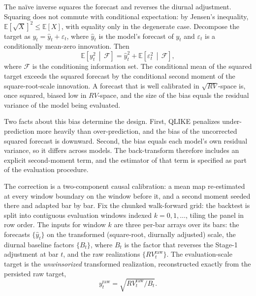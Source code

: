 The na\"ive inverse squares the forecast and reverses the diurnal
adjustment. Squaring does not commute with conditional expectation: by
Jensen's inequality, $\mathbb{E}[\sqrt{X}]^2 \le \mathbb{E}[X]$, with
equality only in the degenerate case. Decompose the target as
$y_{t} = \hat{y}_{t} + \varepsilon_{t}$, where $\hat{y}_t$ is the model's
forecast of $y_t$ and $\varepsilon_t$ is a conditionally mean-zero
innovation. Then
\begin{equation}
    \mathbb{E}\!\left[y_t^2 \,\middle|\, \mathcal{F}\right]
    = \hat{y}_t^2 + \mathbb{E}\!\left[\varepsilon_t^2 \,\middle|\, \mathcal{F}\right],
    \label{eq:second_moment}
\end{equation}
where $\mathcal{F}$ is the conditioning information set. The conditional mean
of the squared target exceeds the squared forecast by the conditional second
moment of the square-root-scale innovation. A forecast that is well
calibrated in $\sqrt{RV}$-space is, once squared, biased low in $RV$-space,
and the size of the bias equals the residual variance of the model being
evaluated.

Two facts about this bias determine the design. First, QLIKE penalizes
under-prediction more heavily than over-prediction, and the bias of the
uncorrected squared forecast is downward. Second, the bias equals each
model's own residual variance, so it differs across models. The
back-transform therefore includes an explicit second-moment term, and the
estimator of that term is specified as part of the evaluation procedure.

\label{sec:smearing_estimator}
\label{sec:smearing}

The correction is a two-component causal calibration: a mean map
re-estimated at every window boundary on the window before it, and a
second moment seeded there and adapted bar by bar. Fix the chunked
walk-forward grid: the backtest is split into contiguous evaluation
windows indexed $k = 0, 1, \dots$, tiling the panel in row order. The
inputs for window $k$ are three per-bar arrays over its bars: the
forecasts $\{\hat{y}_t\}$ on the transformed (square-root, diurnally
adjusted) scale, the diurnal baseline factors $\{B_t\}$, where $B_t$ is
the factor that reverses the Stage-1 adjustment at bar $t$, and the raw
realizations $\{RV^{\mathrm{raw}}_t\}$. The evaluation-scale target is the
\emph{unwinsorized} transformed realization, reconstructed exactly from
the persisted raw target,
\begin{equation}
    y^{\mathrm{raw}}_t = \sqrt{RV^{\mathrm{raw}}_t / B_t}.
    \label{eq:yraw}
\end{equation}

